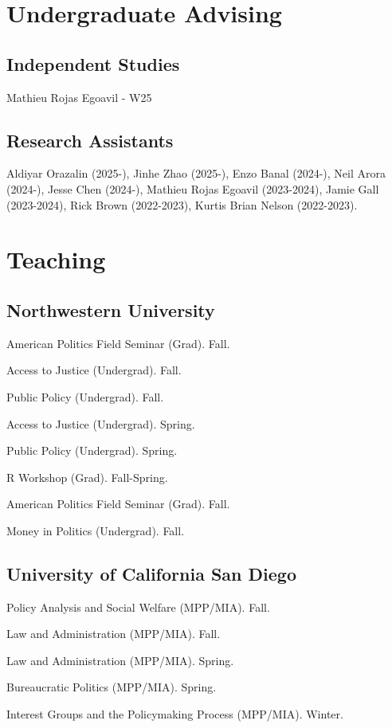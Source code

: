 \documentclass[12pt,letterpaper]{report}
\newcommand{\course}[4]{\item[#1] \tab{}#3 (#4). #2.} %
\begin{document}
    \section*{Undergraduate Advising}
    \subsection*{Independent Studies}
    \begin{tablist}
    \item Mathieu Rojas Egoavil - W25
    \end{tablist}
    \subsection*{Research Assistants}
    Aldiyar Orazalin (2025-), Jinhe Zhao (2025-), Enzo Banal (2024-), Neil Arora (2024-), Jesse Chen (2024-), Mathieu Rojas Egoavil (2023-2024), Jamie Gall (2023-2024), Rick Brown (2022-2023),  Kurtis Brian Nelson (2022-2023). 
    \section*{Teaching}
	
	\subsection*{Northwestern University}
	\begin{tablist}
    \course{2024}{Fall}{American Politics Field Seminar}{Grad}
    \course{2024}{Fall}{Access to Justice}{Undergrad}
	\course{2024}{Fall}{Public Policy}{Undergrad}
    \course{2024}{Spring}{Access to Justice}{Undergrad}
    \course{2024}{Spring}{Public Policy}{Undergrad}
	\course{2022}{Fall-Spring}{R Workshop}{Grad}
	\course{2022}{Fall}{American Politics Field Seminar}{Grad}
	\course{2022}{Fall}{Money in Politics}{Undergrad}
	\end{tablist}
    
    \subsection*{University of California San Diego}
    \begin{tablist}
    \course{2021}{Fall}{Policy Analysis and Social Welfare}{MPP/MIA}{}
    \course{2021}{Fall}{Law and Administration}{MPP/MIA}{}
    \course{2021}{Spring}{Law and Administration}{MPP/MIA}{}
    \course{2021}{Spring}{Bureaucratic Politics}{MPP/MIA}{}
    \course{2021}{Winter}{Interest Groups and the Policymaking Process}{MPP/MIA}{}
    \end{tablist}
    
\end{document}
